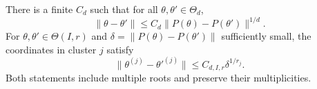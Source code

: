 \begin{lemma}\label{lem:v4-root-modulus}
There is a finite $C_d$ such that for all $\theta,\theta'\in\Theta_d$,
\begin{equation}
 \|\theta-\theta'\|\le C_d\|P(\theta)-P(\theta')\|^{1/d}.
                                                               \label{eq:v4-global-modulus}
\end{equation}
For $\theta,\theta'\in\Theta(I,r)$ and $\delta=\|P(\theta)-P(\theta')\|$
sufficiently small, the coordinates in cluster $j$ satisfy
\begin{equation}
 \|\theta^{(j)}-\theta'^{(j)}\|
 \le C_{d,I,r}\delta^{1/r_j}.                                  \label{eq:v4-local-modulus}
\end{equation}
Both statements include multiple roots and preserve their
multiplicities.
\end{lemma}
